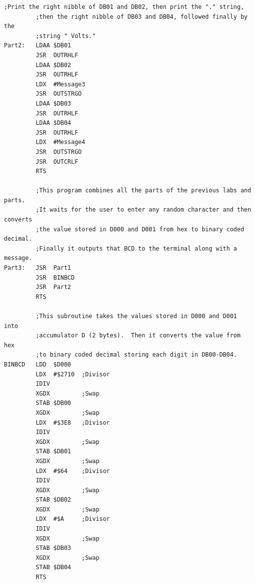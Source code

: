 \documentclass[12pt]{report}
\begin{document}
\begin{Verbatim}[frame=single, fontsize=\small]
         ;Print the right nibble of DB01 and DB02, then print the "." string,
         ;then the right nibble of DB03 and DB04, followed finally by the
         ;string " Volts."
Part2:   LDAA $DB01
         JSR  OUTRHLF
         LDAA $DB02
         JSR  OUTRHLF
         LDX  #Message3
         JSR  OUTSTRGO
         LDAA $DB03
         JSR  OUTRHLF
         LDAA $DB04
         JSR  OUTRHLF
         LDX  #Message4
         JSR  OUTSTRGO
         JSR  OUTCRLF
         RTS
         
         ;This program combines all the parts of the previous labs and parts.
         ;It waits for the user to enter any random character and then converts
         ;the value stored in D000 and D001 from hex to binary coded decimal.
         ;Finally it outputs that BCD to the terminal along with a message.
Part3:   JSR  Part1
         JSR  BINBCD
         JSR  Part2
         RTS

         ;This subroutine takes the values stored in D000 and D001 into 
         ;accumulator D (2 bytes).  Then it converts the value from hex
         ;to binary coded decimal storing each digit in DB00-DB04.
BINBCD   LDD  $D000
         LDX  #$2710  ;Divisor
         IDIV
         XGDX         ;Swap
         STAB $DB00
         XGDX         ;Swap
         LDX  #$3E8   ;Divisor
         IDIV
         XGDX         ;Swap
         STAB $DB01
         XGDX         ;Swap
         LDX  #$64    ;Divisor
         IDIV
         XGDX         ;Swap
         STAB $DB02
         XGDX         ;Swap
         LDX  #$A     ;Divisor
         IDIV
         XGDX         ;Swap
         STAB $DB03
         XGDX         ;Swap
         STAB $DB04
         RTS
	\end{Verbatim}
\end{document}
